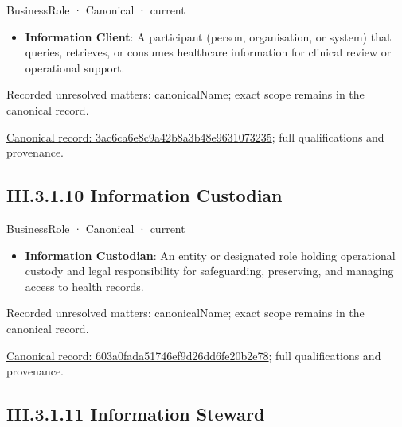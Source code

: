 \label{element:3ac6ca6e8c9a42b8a3b48e9631073235}
{\small BusinessRole · Canonical · current}\par

\begin{itemize}


\item \textbf{Information Client}: A participant (person, organisation, or system) that queries, retrieves, or consumes healthcare information for clinical review or operational support.

\end{itemize}

{\small Recorded unresolved matters: canonicalName; exact scope remains in the canonical record.}\par
{\footnotesize \href{../../../../continuum/business/business-role/3ac6ca6e8c9a42b8a3b48e9631073235.md}{Canonical record: 3ac6ca6e8c9a42b8a3b48e9631073235}; full qualifications and provenance.}\par
\subsection*{III.3.1.10 Information Custodian}
\label{navigation:III.3.1.10}

\label{element:603a0fada51746ef9d26dd6fe20b2e78}
{\small BusinessRole · Canonical · current}\par

\begin{itemize}


\item \textbf{Information Custodian}: An entity or designated role holding operational custody and legal responsibility for safeguarding, preserving, and managing access to health records.

\end{itemize}

{\small Recorded unresolved matters: canonicalName; exact scope remains in the canonical record.}\par
{\footnotesize \href{../../../../continuum/business/business-role/603a0fada51746ef9d26dd6fe20b2e78.md}{Canonical record: 603a0fada51746ef9d26dd6fe20b2e78}; full qualifications and provenance.}\par
\subsection*{III.3.1.11 Information Steward}
\label{navigation:III.3.1.11}

